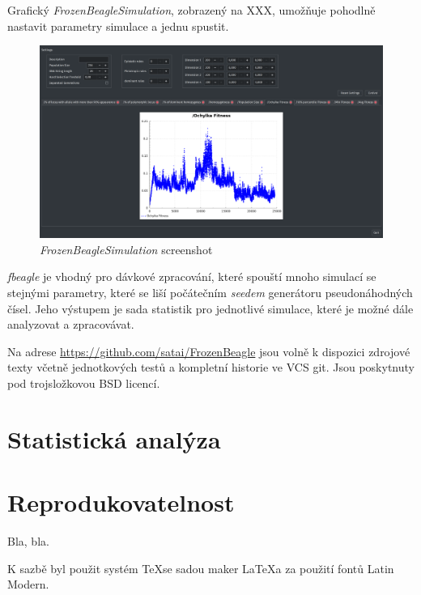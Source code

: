 Grafický \textit{FrozenBeagleSimulation}, zobrazený na XXX,
umožňuje pohodlně nastavit parametry simulace a jednu spustit.



\begin{figure}
\centering
\includegraphics[totalheight=8cm]{img/Screenshot.pdf}
    \caption{\textit{FrozenBeagleSimulation} screenshot}
\end{figure}


\textit{fbeagle} je vhodný pro dávkové zpracování, které spouští mnoho simulací se stejnými parametry, které se liší
počátečním \textit{seedem} generátoru pseudonáhodných čísel. Jeho výstupem je sada statistik pro jednotlivé simulace,
které je možné dále analyzovat a zpracovávat.

Na adrese \url {https://github.com/satai/FrozenBeagle} jsou volně k dispozici zdrojové texty včetně jednotkových testů
a kompletní historie ve VCS git. Jsou poskytnuty pod trojsložkovou BSD licencí.

\section{Statistická analýza}

\section{Reprodukovatelnost}

Bla, bla.

K sazbě byl použit systém \TeX se sadou maker \LaTeX a za použití fontů Latin Modern.
